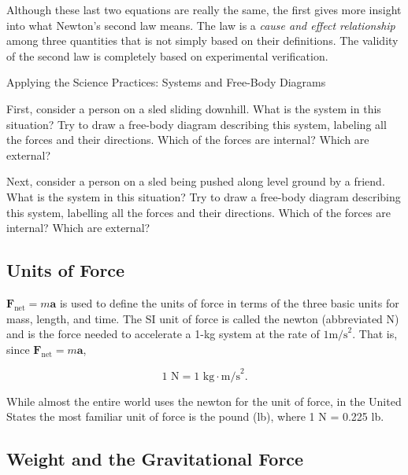 \documentclass[
]{book}
\newenvironment{note}{}{}
\begin{document}
Although these last two equations are really the same, the first gives
more insight into what Newton's second law means. The law is a \emph{cause
and effect relationship} among three quantities that is not simply based
on their definitions. The validity of the second law is completely based
on experimental verification.

\hypertarget{fs-id1485153}{}
\begin{note}

Applying the Science Practices: Systems and Free-Body Diagrams

First, consider a person on a sled sliding downhill. What is the system
in this situation? Try to draw a free-body diagram describing this
system, labeling all the forces and their directions. Which of the
forces are internal? Which are external?

Next, consider a person on a sled being pushed along level ground by a
friend. What is the system in this situation? Try to draw a free-body
diagram describing this system, labelling all the forces and their
directions. Which of the forces are internal? Which are external?

\end{note}

\hypertarget{import-auto-id1422615}{}
\hypertarget{units-of-force}{%
\subsection{Units of Force}\label{units-of-force}}

\({\textbf{F}_{\text{net}} = m\textbf{a}}{}\) is used to define the units
of force in terms of the three basic units for mass, length, and time.
The SI unit of force is called the \protect\hypertarget{import-auto-id2929123}{}{newton} (abbreviated N) and is the force needed to accelerate
a 1-kg system at the rate of \({1\text{m/s}^{2}}{}\). That is, since
\({\textbf{F}_{\text{net}} = m\textbf{a}}{}\),

\leavevmode\hypertarget{eip-id2390555}{}%
\[{\text{1\ N} = {\text{1\ kg} \cdot \text{m/s}^{2}}}.\]

While almost the entire world uses the newton for the unit of force, in
the United States the most familiar unit of force is the pound (lb),
where 1 N = 0.225 lb.

\hypertarget{import-auto-id1404093}{}
\hypertarget{weight-and-the-gravitational-force}{%
\subsection{Weight and the Gravitational Force}\label{weight-and-the-gravitational-force}}
\end{document}
